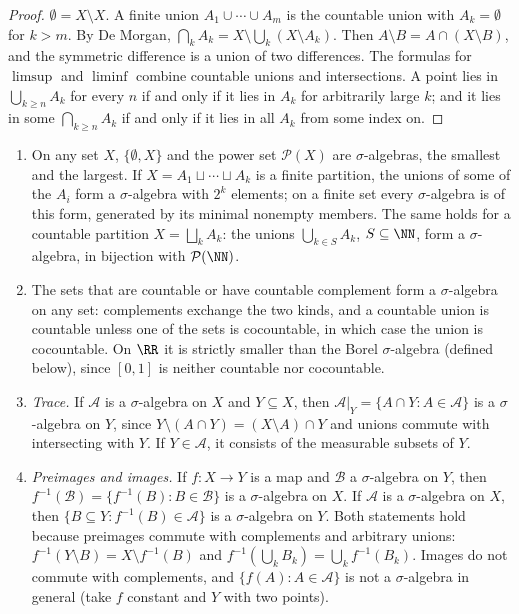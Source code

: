 \begin{proof}
$\emptyset = X \setminus X$. A finite union $A_1 \cup \cdots \cup A_m$ is the countable union with $A_k = \emptyset$ for $k > m$. By De Morgan, $\bigcap_kA_k = X \setminus \bigcup_k(X \setminus A_k)$.
Then $A \setminus B = A \cap (X \setminus B)$, and the symmetric difference is a union of two differences. The formulas for $\limsup$ and $\liminf$ combine countable unions and intersections. A point
lies in $\bigcup_{k \geq n}A_k$ for every $n$ if and only if it lies in $A_k$ for arbitrarily large $k$; and it lies in some $\bigcap_{k \geq n}A_k$ if and only if it lies in all $A_k$ from some
index on.
\end{proof}

\begin{example}\label{measure-theory:example-sigma-algebras}
\begin{enumerate}
\item On any set $X$, $\{\emptyset, X\}$ and the power set $\mathcal{P}(X)$ are $\sigma$-algebras, the smallest and the largest. If $X = A_1 \sqcup \cdots \sqcup A_k$ is a finite partition, the unions of some of
the $A_i$ form a $\sigma$-algebra with $2^k$ elements; on a finite set every $\sigma$-algebra is of this form, generated by its minimal nonempty members. The same holds for a countable partition
$X = \bigsqcup_kA_k$: the unions $\bigcup_{k \in S}A_k$, $S \subseteq \NN$, form a $\sigma$-algebra, in bijection with $\mathcal{P}(\NN)$.
\item The sets that are countable or have countable complement form a $\sigma$-algebra on any set: complements exchange the two kinds, and a countable union is countable unless one of the sets is
cocountable, in which case the union is cocountable. On $\RR$ it is strictly smaller than the Borel $\sigma$-algebra (defined below), since $[0, 1]$ is neither countable nor cocountable.
\item \emph{Trace.} If $\mathcal{A}$ is a $\sigma$-algebra on $X$ and $Y \subseteq X$, then $\mathcal{A}|_Y = \{A \cap Y : A \in \mathcal{A}\}$ is a $\sigma$-algebra on $Y$, since
$Y \setminus (A \cap Y) = (X \setminus A) \cap Y$ and unions commute with intersecting with $Y$. If $Y \in \mathcal{A}$, it consists of the measurable subsets of $Y$.
\item \emph{Preimages and images.} If $f \colon X \to Y$ is a map and $\mathcal{B}$ a $\sigma$-algebra on $Y$, then $f^{-1}(\mathcal{B}) = \{f^{-1}(B) : B \in \mathcal{B}\}$ is a $\sigma$-algebra on $X$. If
$\mathcal{A}$ is a $\sigma$-algebra on $X$, then $\{B \subseteq Y : f^{-1}(B) \in \mathcal{A}\}$ is a $\sigma$-algebra on $Y$. Both statements hold because preimages commute with complements and
arbitrary unions: $f^{-1}(Y \setminus B) = X \setminus f^{-1}(B)$ and $f^{-1}(\bigcup_kB_k) = \bigcup_kf^{-1}(B_k)$. Images do not commute with complements, and $\{f(A) : A \in \mathcal{A}\}$ is not a
$\sigma$-algebra in general (take $f$ constant and $Y$ with two points).
\end{enumerate}
\end{example}

